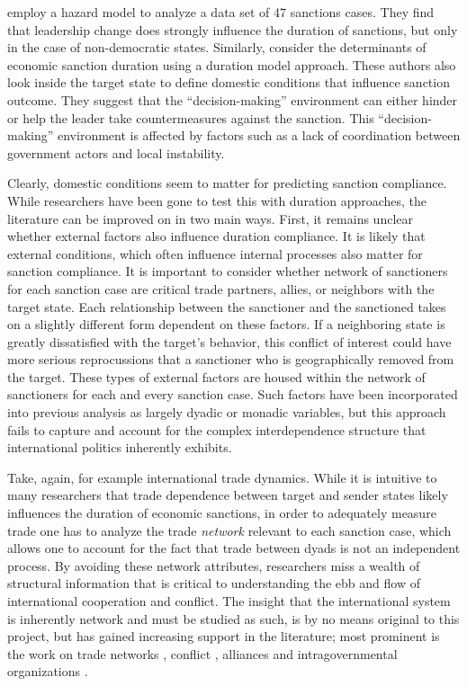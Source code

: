 \cite{mcgillivray2004} employ a hazard model to analyze a data set of 47 sanctions cases. They find that leadership change does strongly influence the duration of sanctions, but only in the case of non-democratic states. Similarly, \cite{bolks2000} consider the determinants of economic sanction duration using a duration model approach. These authors also look inside the target state to define domestic conditions that influence sanction outcome. They suggest that the ``decision-making'' environment can either hinder or help the leader take countermeasures against the sanction. This ``decision-making'' environment is affected by factors such as a lack of coordination between government actors and local instability. 

Clearly, domestic conditions seem to matter for predicting sanction compliance. While researchers have been gone to test this with duration approaches, the literature can be improved on in two main ways. First, it remains unclear whether external factors also influence duration compliance. It is likely that external conditions, which often influence internal processes also matter for sanction compliance. It is important to consider whether network of sanctioners for each sanction case are critical trade partners, allies, or neighbors with the target state. Each relationship between the sanctioner and the sanctioned takes on a slightly different form dependent on these factors. If a neighboring state is greatly dissatisfied with the target's behavior, this conflict of interest could have more serious reprocussions that a sanctioner who is geographically removed from the target. These types of external factors are housed within the network of sanctioners for each and every sanction case. Such factors have been incorporated into previous analysis as largely dyadic or monadic variables, but this approach fails to capture and account for the complex interdependence structure that international politics inherently exhibits. 

Take, again, for example international trade dynamics. While it is intuitive to many researchers that trade dependence between target and sender states likely influences the duration of economic sanctions, in order to adequately measure trade one has to analyze the trade \textit{network} relevant to each sanction case, which allows one to account for the fact that trade between dyads is not an independent process. By avoiding these network attributes, researchers miss a wealth of structural information that is critical to understanding the ebb and flow of international cooperation and conflict. The insight that the international system is inherently  network and must be studied as such, is by no means original to this project, but has gained increasing support in the literature; most prominent is the work on trade networks\citep{hoff2004modeling} , conflict \citep{dorff2013}, alliances \citep{warren2010geometry} and intragovernmental organizations \citep{cao2009networks,greenhill2010norm}.

